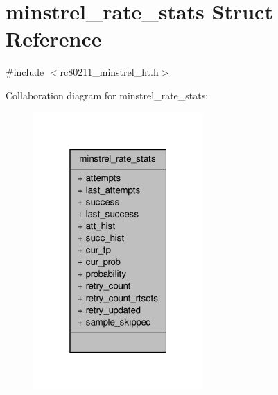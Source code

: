 \hypertarget{structminstrel__rate__stats}{\section{minstrel\-\_\-rate\-\_\-stats Struct Reference}
\label{structminstrel__rate__stats}
}


{\ttfamily \#include $<$rc80211\-\_\-minstrel\-\_\-ht.\-h$>$}



Collaboration diagram for minstrel\-\_\-rate\-\_\-stats\-:
\nopagebreak
\begin{figure}[H]
\begin{center}
\leavevmode
\includegraphics[width=184pt]{structminstrel__rate__stats__coll__graph}
\end{center}
\end{figure}
